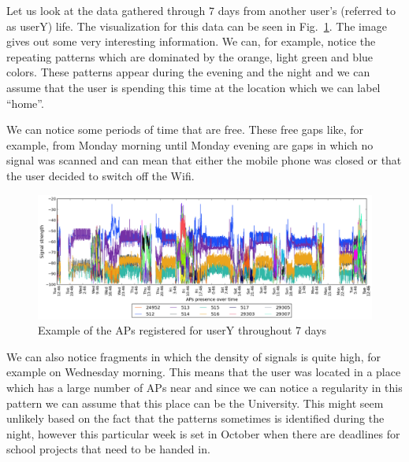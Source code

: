 Let us look at the data gathered through $7$ days from another user's (referred
to as userY) life. The visualization for this data can be seen in
Fig.~\ref{user_3_7d}. The image gives out some very interesting information. We
can, for example, notice the repeating patterns which are dominated by the
orange, light green and blue colors. These patterns appear during the evening
and the night and we can assume that the user is spending this time at the
location which we can label ``home''.

We can notice some periods of time that are free. These free gaps like, for
example, from Monday morning until Monday evening are gaps in which no signal
was scanned and can mean that either the mobile phone was closed or that the
user decided to switch off the Wifi.

\begin{figure}[h]
\centering
\includegraphics[width
=\textwidth, height =
0.4\textwidth]{figures/user_3_sorted_7days_plot.png}
\caption{Example of the APs registered for userY throughout 7 days}
\label{user_3_7d}
\end{figure}

We can also notice fragments in which the density of signals is quite high, for
example on Wednesday morning. This means that the user was located in a place
which has a large number of APs near and since we can notice a regularity in
this pattern we can assume that this place can be the University. This might
seem unlikely based on the fact that the patterns sometimes is identified during
the night, however this particular week is set in October when there are
deadlines for school projects that need to be handed in.

